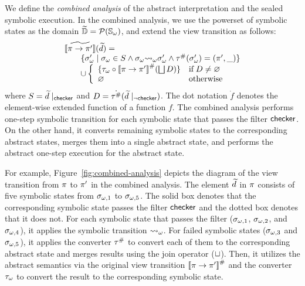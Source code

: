 We define the \textit{combined analysis} of the abstract interpretation and the
sealed symbolic execution.  In the combined analysis, we use the powerset of
symbolic states as the domain $\widetilde{\mathbb{D}} = \mathcal{P}({\mathbb{S}}_\omega)$, and extend the
view transition as follows:
\[
  \begin{array}{l}
    [\![{\widetilde{\pi \rightarrow \pi'}}]\!](\widetilde{d}) =\\
    \qquad \{
      {\sigma}_\omega' \mid {\sigma}_\omega \in S \wedge
      {\sigma}_\omega {\leadsto}_\omega {\sigma}_\omega' \wedge
      {\tau}^{\#}({\sigma}_\omega') = (\pi', \_)
    \}\\
    \qquad \cup \left\{
    \begin{array}{ll}
      \{ {\tau}_\omega \circ {[\![{\pi\rightarrow \pi'}]\!]}^{\#}(\bigsqcup D) \}
      & \text{if} \; D \neq \varnothing\\
      \varnothing & \text{otherwise}\\
    \end{array}
    \right.
  \end{array}
\]
where $S = \widetilde{d}\mid_{\textsf{checker}}$ and $D =
\dot{{\tau}^{\#}}(\widetilde{d}\mid_{\neg\textsf{checker}})$.  The dot notation $\dot{f}$
denotes the element-wise extended function of a function $f$.  The combined
analysis performs one-step symbolic transition for each symbolic state that
passes the filter $\textsf{checker}$. On the other hand, it converts remaining symbolic
states to the corresponding abstract states, merges them into a single abstract
state, and performs the abstract one-step execution for the abstract state.

For example, Figure~\ref{fig:combined-analysis} depicts the
diagram of the view transition from $\pi$ to $\pi'$ in the combined
analysis.  The element $\widetilde{d}$ in $\pi$ consists of five symbolic states
from $\sigma_{\omega,1}$ to $\sigma_{\omega,5}$.  The solid box denotes that the corresponding
symbolic state passes the filter $\textsf{checker}$ and the dotted box denotes that it
does not.  For each symbolic state that passes the filter ($\sigma_{\omega,1}$,
$\sigma_{\omega,2}$, and $\sigma_{\omega,4}$), it applies the symbolic transition ${\leadsto}_\omega$.
For failed symbolic states ($\sigma_{\omega,3}$ and $\sigma_{\omega,5}$), it applies the
converter ${\tau}^{\#}$ to convert each of them to the corresponding abstract
state and merges results using the join operator ($\sqcup$).  Then, it utilizes
the abstract semantics via the original view transition
${[\![{\pi \rightarrow \pi'}]\!]}^{\#}$ and the converter ${\tau}_\omega$ to convert the
result to the corresponding symbolic state.

